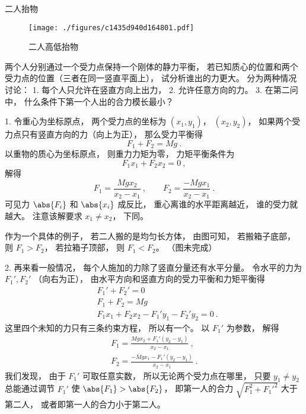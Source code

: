 \begin{example}{二人抬物}
\begin{figure}[ht]
\centering
\texttt{[image: ./figures/c1435d940d164801.pdf]}
\caption{二人高低抬物} \label{fig_RBSt_2}
\end{figure}
两个人分别通过一个受力点保持一个刚体的静力平衡， 若已知质心的位置和两个受力点的位置（三者在同一竖直平面上）， 试分析谁出的力更大。 分为两种情况讨论： 1. 每个人只允许在竖直方向上出力， 2. 允许任意方向的力。 3. 在第二问中， 什么条件下第一个人出的合力模长最小？

1. 令重心为坐标原点， 两个受力点的坐标为 $(x_1, y_1)$， $(x_2, y_2)$， 如果两个受力点只有竖直方向的力（向上为正）， 那么受力平衡得
\begin{equation}
F_1 + F_2 = Mg~.
\end{equation}
以重物的质心为坐标原点， 则重力力矩为零， 力矩平衡条件为
\begin{equation}
F_1 x_1 + F_2 x_2 = 0~,
\end{equation}
解得
\begin{equation}
F_1 = \frac{Mg x_2}{x_2 - x_1} ~,\qquad F_2 = \frac{-Mg x_1}{x_2 - x_1}~.
\end{equation}
可见力 $\abs{F_i}$ 和 $\abs{x_i}$ 成反比， 重心离谁的水平距离越近， 谁的受力就越大。 注意该解要求 $x_1 \ne x_2$， 下同。

作为一个具体的例子， 若二人搬的是均匀长方体， 由图可知， 若搬箱子底部， 则 $F_1 > F_2$， 若拉箱子顶部， 则 $F_1 < F_2$。 （图未完成）

2. 再来看一般情况， 每个人施加的力除了竖直分量还有水平分量。 令水平的力为 $F_1', F_2'$ （向右为正）， 由水平方向和竖直方向的受力平衡和力矩平衡得
\begin{equation}
\begin{aligned}
&F_1' + F_2' = 0\\
&F_1 + F_2 = Mg\\
&F_1 x_1 + F_2 x_2 - F_1' y_1 - F_2' y_2 = 0~.
\end{aligned}
\end{equation}
这里四个未知的力只有三条约束方程， 所以有一个。 以 $F_1'$ 为参数， 解得
\begin{equation}\label{eq_RBSt_1}
\begin{aligned}
F_1 = \frac{Mg x_2 + F_1'(y_2 - y_1)}{x_2 - x_1}~,\\
F_2 = \frac{-Mg x_1 - F_1'(y_2 - y_1)}{x_2 - x_1}~.
\end{aligned}
\end{equation}
我们发现， 由于 $F_1'$ 可取任意实数， 所以无论两个受力点在哪里， 只要 $y_1 \ne y_2$ 总能通过调节 $F_1'$ 使 $\abs{F_1} > \abs{F_2}$， 即第一人的合力 $\sqrt{F_1^2 + F_1'^2}$ 大于第二人， 或者即第一人的合力小于第二人。


\end{example}
